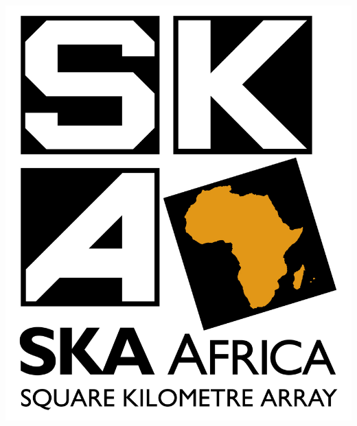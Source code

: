 \documentclass[a0,portrait]{a0poster}
\begin{document}
\begin{multicols}{2}

%
%  
%  


\begin{center}\vspace{1cm}
\includegraphics[width=0.35\linewidth]{ska_logo.jpg}
\end{center}\vspace{1cm}


% 


\end{multicols}
\end{document}
